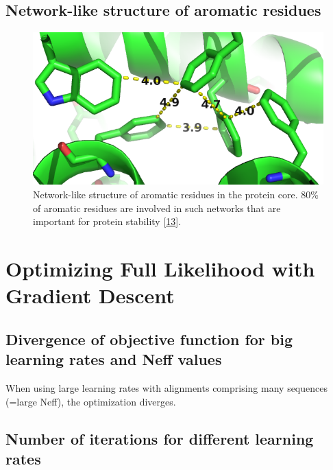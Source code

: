 \documentclass[12pt,a4paper,twoside]{book}
\theoremstyle{definition}
\theoremstyle{definition}
\theoremstyle{remark}
\begin{document}
\section{Network-like structure of aromatic
residues}\label{aromatic-network}






\begin{figure}
\includegraphics[width=0.5\linewidth]{img/coupling_matrix_analysis/aromatic_bundle} \caption{Network-like structure of aromatic
residues in the protein core. 80\% of aromatic residues are involved in
such networks that are important for protein stability
{[}\protect\hyperlink{ref-Burley1985}{13}{]}.}\label{fig:aromatic-network}
\end{figure}

\chapter{Optimizing Full Likelihood with Gradient
Descent}\label{optimizing-full-likelihood-with-gradient-descent}

\section{Divergence of objective function for big learning rates and
Neff values}\label{cd-large-alpha-large-neff}

When using large learning rates with alignments comprising many
sequences (=large Neff), the optimization diverges.

\section{Number of iterations for different learning
rates}\label{number-of-iterations-for-different-learning-rates}
\end{document}

